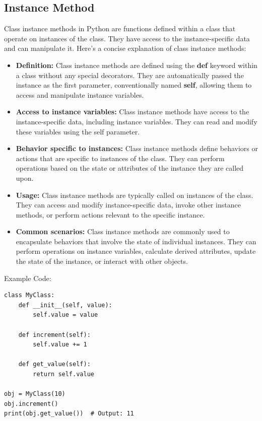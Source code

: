 \documentclass{report}
\begin{document}
    \bigbreak \noindent \bigbreak \noindent 
    \subsection{Instance Method}
    \bigbreak \noindent 
    Class instance methods in Python are functions defined within a class that operate on instances of the class. They have access to the instance-specific data and can manipulate it. Here's a concise explanation of class instance methods:
    \begin{itemize}
        \item \textbf{Definition:} Class instance methods are defined using the \textbf{def} keyword within a class without any special decorators. They are automatically passed the instance as the first parameter, conventionally named \textbf{self}, allowing them to access and manipulate instance variables.
        \item \textbf{Access to instance variables:} Class instance methods have access to the instance-specific data, including instance variables. They can read and modify these variables using the self parameter.
        \item \textbf{Behavior specific to instances:} Class instance methods define behaviors or actions that are specific to instances of the class. They can perform operations based on the state or attributes of the instance they are called upon.
        \item \textbf{Usage:} Class instance methods are typically called on instances of the class. They can access and modify instance-specific data, invoke other instance methods, or perform actions relevant to the specific instance.
        \item \textbf{Common scenarios:} Class instance methods are commonly used to encapsulate behaviors that involve the state of individual instances. They can perform operations on instance variables, calculate derived attributes, update the state of the instance, or interact with other objects.
    \end{itemize}
    \bigbreak \noindent 
    Example Code:
    \begin{verbatim}
class MyClass:
    def __init__(self, value):
        self.value = value

    def increment(self):
        self.value += 1

    def get_value(self):
        return self.value

obj = MyClass(10)
obj.increment()
print(obj.get_value())  # Output: 11
    \end{verbatim}
\end{document}
